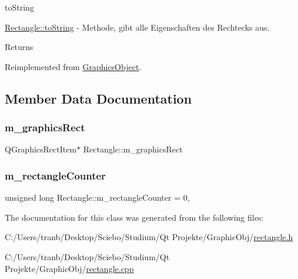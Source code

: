 to\+String 

\hyperlink{class_rectangle_a75b1e77ef828ff8de86cfcf6b03bfadb}{Rectangle\+::to\+String} -\/ Methode, gibt alle Eigenschaften des Rechtecks aus.

\begin{DoxyReturn}{Returns}

\end{DoxyReturn}


Reimplemented from \hyperlink{class_graphics_object_ad985316df1516a5a7311161250b5e233}{Graphics\+Object}.



\subsection{Member Data Documentation}
\mbox{\label{class_rectangle_a4d7f03c65f5e27a63a3299aac6da3954}} 
\subsubsection{\texorpdfstring{m\+\_\+graphics\+Rect}{m\_graphicsRect}}
{\footnotesize\ttfamily Q\+Graphics\+Rect\+Item$\ast$ Rectangle\+::m\+\_\+graphics\+Rect\hspace{0.3cm}{\ttfamily [protected]}}

\mbox{\label{class_rectangle_aa5a0b5d899df185e221e17d032472352}} 
\subsubsection{\texorpdfstring{m\+\_\+rectangle\+Counter}{m\_rectangleCounter}}
{\footnotesize\ttfamily unsigned long Rectangle\+::m\+\_\+rectangle\+Counter = 0\hspace{0.3cm}{\ttfamily [static]}, {\ttfamily [protected]}}



The documentation for this class was generated from the following files\+:\begin{DoxyCompactItemize}
\item 
C\+:/\+Users/tranb/\+Desktop/\+Sciebo/\+Studium/\+Qt Projekte/\+Graphic\+Obj/\hyperlink{rectangle_8h}{rectangle.\+h}\item 
C\+:/\+Users/tranb/\+Desktop/\+Sciebo/\+Studium/\+Qt Projekte/\+Graphic\+Obj/\hyperlink{rectangle_8cpp}{rectangle.\+cpp}\end{DoxyCompactItemize}
